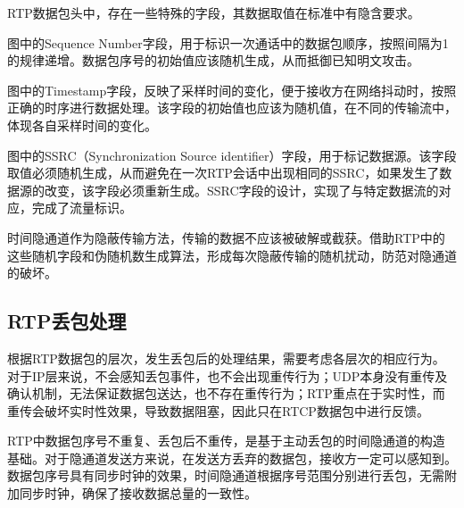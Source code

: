 RTP数据包头中，存在一些特殊的字段，其数据取值在标准中有隐含要求。

图中的Sequence Number字段，用于标识一次通话中的数据包顺序，按照间隔为1的规律递增。数据包序号的初始值应该随机生成，从而抵御已知明文攻击。

图中的Timestamp字段，反映了采样时间的变化，便于接收方在网络抖动时，按照正确的时序进行数据处理。该字段的初始值也应该为随机值，在不同的传输流中，体现各自采样时间的变化。

图中的SSRC（Synchronization Source identifier）字段，用于标记数据源。该字段取值必须随机生成，从而避免在一次RTP会话中出现相同的SSRC，如果发生了数据源的改变，该字段必须重新生成。SSRC字段的设计，实现了与特定数据流的对应，完成了流量标识。

时间隐通道作为隐蔽传输方法，传输的数据不应该被破解或截获。借助RTP中的这些随机字段和伪随机数生成算法，形成每次隐蔽传输的随机扰动，防范对隐通道的破坏。

\subsection{RTP丢包处理}
\label{chap:backinfo:rtp:dropout}

根据RTP数据包的层次，发生丢包后的处理结果，需要考虑各层次的相应行为。对于IP层来说，不会感知丢包事件，也不会出现重传行为；UDP本身没有重传及确认机制，无法保证数据包送达，也不存在重传行为；RTP重点在于实时性，而重传会破坏实时性效果，导致数据阻塞，因此只在RTCP数据包中进行反馈。

RTP中数据包序号不重复、丢包后不重传，是基于主动丢包的时间隐通道的构造基础。对于隐通道发送方来说，在发送方丢弃的数据包，接收方一定可以感知到。数据包序号具有同步时钟的效果，时间隐通道根据序号范围分别进行丢包，无需附加同步时钟，确保了接收数据总量的一致性。